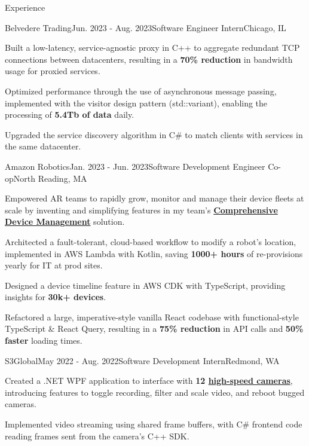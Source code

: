 \documentclass{resume}
\begin{document}
  \begin{rSection}{Experience}

    \begin{rSubsection}{Belvedere Trading}{Jun. 2023 - Aug. 2023}{Software Engineer Intern}{Chicago, IL}
      \item Built a low-latency, service-agnostic proxy in C++ to aggregate redundant TCP
        connections between datacenters, resulting in a \textbf{70\% reduction} in bandwidth usage for proxied services.
      \item Optimized performance through the use of asynchronous message passing, implemented with the visitor
        design pattern (std::variant), enabling the processing of \textbf{5.4Tb of data} daily.      
      \item Upgraded the service discovery algorithm in C\# to match clients with services in the same datacenter.
    \end{rSubsection}

    \begin{rSubsection}{Amazon Robotics}{Jan. 2023 - Jun. 2023}{Software Development Engineer Co-op}{North Reading, MA}
      \item Empowered AR teams to rapidly grow, monitor and manage their device fleets at scale by inventing and simplifying
        features in my team's 
        \textbf{\href{https://www.allthingsdistributed.com/2021/07/amazon-robotics-on-aws.html}{Comprehensive Device Management}} solution. 
      \item Architected a fault-tolerant, cloud-based workflow to modify a robot's location, implemented in AWS Lambda with Kotlin, 
        saving \textbf{1000+ hours} of re-provisions yearly for IT at prod sites.
      \item Designed a device timeline feature in AWS CDK with TypeScript, providing insights for \textbf{30k+ devices}. 
      \item Refactored a large, imperative-style vanilla React codebase with functional-style 
        TypeScript \& React Query, resulting in a \textbf{75\% reduction} in API calls and \textbf{50\% faster} loading times.
    \end{rSubsection}

    \begin{rSubsection}{S3Global}{May 2022 - Aug. 2022}{Software Development Intern}{Redmond, WA}
      \item Created a .NET WPF application to interface with \textbf{12 \href{https://emergentvisiontec.com/}{high-speed cameras}}, 
        introducing features to toggle recording, filter and scale video, and reboot bugged cameras.
      \item Implemented video streaming using shared frame buffers, with C\# frontend code 
        reading frames sent from the camera's C++ SDK.
    \end{rSubsection}

  \end{rSection}
  
\end{document}
